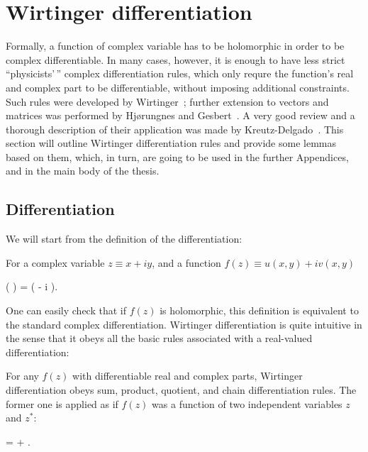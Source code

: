 \chapter{Wirtinger differentiation}
\label{cha:appendix:c-numbers}

Formally, a function of complex variable has to be holomorphic in order to be complex differentiable.
In many cases, however, it is enough to have less strict ``physicists'\,'' complex differentiation rules, which only requre the function's real and complex part to be differentiable, without imposing additional constraints.
Such rules were developed by Wirtinger~\cite{Wirtinger1927}; further extension to vectors and matrices was performed by Hj{\o}rungnes and Gesbert~\cite{Hjorungnes2007}.
A very good review and a thorough description of their application was made by Kreutz-Delgado~\cite{Kreutz-Delgado2009}.
This section will outline Wirtinger differentiation rules and provide some lemmas based on them, which, in turn, are going to be used in the further Appendices, and in the main body of the thesis.


\section{Differentiation}

We will start from the definition of the differentiation:

\begin{definition}
\label{def:c-numbers:wirtinger}
	For a complex variable $z \equiv x + iy$, and a function $f(z) \equiv u(x, y) + iv(x, y)$
	\begin{eqn*}
		\left(  \right)
		=  \left(
			 - i 
		\right).
	\end{eqn*}
\end{definition}

One can easily check that if $f(z)$ is holomorphic, this definition is equivalent to the standard complex differentiation.
Wirtinger differentiation is quite intuitive in the sense that it obeys all the basic rules associated with a real-valued differentiation:

\begin{theorem}
\label{thm:c-numbers:diff-properties}
	For any $f(z)$ with differentiable real and complex parts, Wirtinger differentiation obeys sum, product, quotient, and chain differentiation rules.
	The former one is applied as if $f(z)$ was a function of two independent variables $z$ and $z^*$:
	\begin{eqn*}
		\frac{\upd f(g(z))}{\upd z}
		=  \frac{\upd g}{\upd z}
			+  \frac{\upd g^*}{\upd z}.
	\end{eqn*}
\end{theorem}

